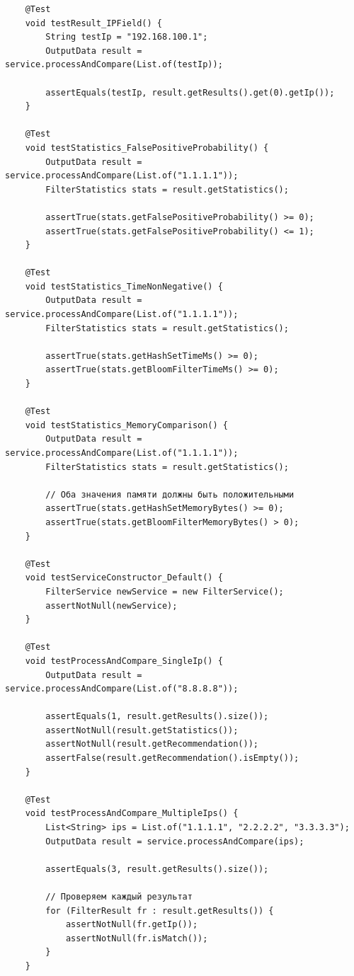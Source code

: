 \begin{verbatim}
    @Test
    void testResult_IPField() {
        String testIp = "192.168.100.1";
        OutputData result = service.processAndCompare(List.of(testIp));

        assertEquals(testIp, result.getResults().get(0).getIp());
    }

    @Test
    void testStatistics_FalsePositiveProbability() {
        OutputData result = service.processAndCompare(List.of("1.1.1.1"));
        FilterStatistics stats = result.getStatistics();

        assertTrue(stats.getFalsePositiveProbability() >= 0);
        assertTrue(stats.getFalsePositiveProbability() <= 1);
    }

    @Test
    void testStatistics_TimeNonNegative() {
        OutputData result = service.processAndCompare(List.of("1.1.1.1"));
        FilterStatistics stats = result.getStatistics();

        assertTrue(stats.getHashSetTimeMs() >= 0);
        assertTrue(stats.getBloomFilterTimeMs() >= 0);
    }

    @Test
    void testStatistics_MemoryComparison() {
        OutputData result = service.processAndCompare(List.of("1.1.1.1"));
        FilterStatistics stats = result.getStatistics();

        // Оба значения памяти должны быть положительными
        assertTrue(stats.getHashSetMemoryBytes() >= 0);
        assertTrue(stats.getBloomFilterMemoryBytes() > 0);
    }

    @Test
    void testServiceConstructor_Default() {
        FilterService newService = new FilterService();
        assertNotNull(newService);
    }

    @Test
    void testProcessAndCompare_SingleIp() {
        OutputData result = service.processAndCompare(List.of("8.8.8.8"));

        assertEquals(1, result.getResults().size());
        assertNotNull(result.getStatistics());
        assertNotNull(result.getRecommendation());
        assertFalse(result.getRecommendation().isEmpty());
    }

    @Test
    void testProcessAndCompare_MultipleIps() {
        List<String> ips = List.of("1.1.1.1", "2.2.2.2", "3.3.3.3");
        OutputData result = service.processAndCompare(ips);

        assertEquals(3, result.getResults().size());

        // Проверяем каждый результат
        for (FilterResult fr : result.getResults()) {
            assertNotNull(fr.getIp());
            assertNotNull(fr.isMatch());
        }
    }


\end{verbatim}
